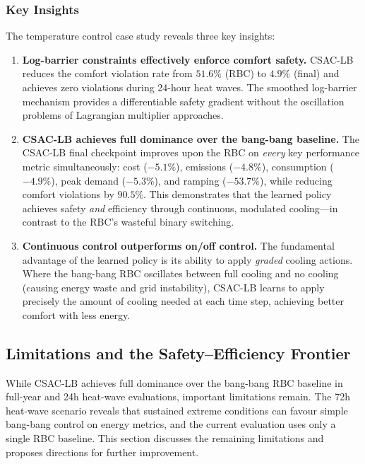 \subsubsection{Key Insights}

The temperature control case study reveals three key insights:

\begin{enumerate}
  \item \textbf{Log-barrier constraints effectively enforce comfort safety.}
    CSAC-LB reduces the comfort violation rate from $51.6\%$ (RBC) to $4.9\%$
    (final) and achieves zero violations during 24-hour heat waves.  The
    smoothed log-barrier mechanism provides a differentiable safety gradient
    without the oscillation problems of Lagrangian multiplier approaches.

  \item \textbf{CSAC-LB achieves full dominance over the bang-bang baseline.}
    The CSAC-LB final checkpoint improves upon the RBC on \emph{every} key
    performance metric simultaneously: cost ($-5.1\%$), emissions ($-4.8\%$),
    consumption ($-4.9\%$), peak demand ($-5.3\%$), and ramping ($-53.7\%$),
    while reducing comfort violations by $90.5\%$.  This demonstrates that
    the learned policy achieves safety \emph{and} efficiency through
    continuous, modulated cooling---in contrast to the RBC's wasteful
    binary switching.

  \item \textbf{Continuous control outperforms on/off control.}
    The fundamental advantage of the learned policy is its ability to apply
    \emph{graded} cooling actions.  Where the bang-bang RBC oscillates between
    full cooling and no cooling (causing energy waste and grid instability),
    CSAC-LB learns to apply precisely the amount of cooling needed at each
    time step, achieving better comfort with less energy.
\end{enumerate}


\subsection{Limitations and the Safety--Efficiency Frontier}
\label{sec:temp-limitations}

While CSAC-LB achieves full dominance over the bang-bang RBC baseline in
full-year and 24h heat-wave evaluations, important limitations remain.  The
72h heat-wave scenario reveals that sustained extreme conditions can favour
simple bang-bang control on energy metrics, and the current evaluation uses
only a single RBC baseline.  This section discusses the remaining limitations
and proposes directions for further improvement.

